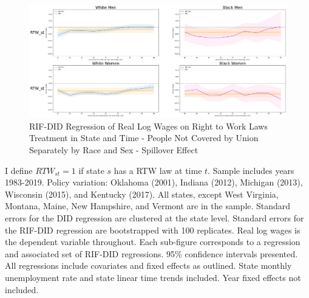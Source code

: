 \documentclass[11pt]{article}
\begin{document}
{\pagebreak
\begin{landscape}
\begin{figure}[ht!]
\centering
    \caption{RIF-DID Regression of Real Log Wages on Right to Work Laws Treatment in State and Time - People Not Covered by Union Separately by Race and Sex - Spillover Effect}\label{fig:rifdid-sltt-bw-B}
    \includegraphics[width=1.25\textwidth, height = \textheight, keepaspectratio]{figures/fin_rifdid-sltt-bw-B.png}
\end{figure}
\footnotesize{I define $RTW_{st} = 1$ if state $s$ has a RTW law at time $t$. Sample includes years 1983-2019. Policy variation: Oklahoma (2001), Indiana (2012), Michigan (2013), Wisconsin (2015), and Kentucky (2017). All states, except West Virginia, Montana, Maine, New Hampshire, and Vermont are in the sample. Standard errors for the DID regression are clustered at the state level. Standard errors for the RIF-DID regression are bootstrapped with 100 replicates. Real log wages is the dependent variable throughout. Each sub-figure corresponds to a regression and associated set of RIF-DID regressions. 95\% confidence intervals presented. All regressions include covariates and fixed effects as outlined. State monthly unemployment rate and state linear time trends included. Year fixed effects not included.}
\end{landscape}

}
\end{document}
